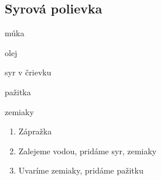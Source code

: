 \setcounter{step}{0}
\subsection{Syrová polievka}

\begin{ingredient}
\def\portions{4}%

\begin{main}
	\item múka
	\item olej
	\item syr v črievku
	\item pažitka
	\item zemiaky
\end{main}
\end{ingredient}
\begin{recipe}

\begin{enumerate}


\item{Zápražka}
\item{Zalejeme vodou, pridáme syr, zemiaky}
\item{Uvaríme zemiaky, pridáme pažitku}	

\end{enumerate}
\end{recipe}

\begin{notes}

\end{notes}
\clearpage	